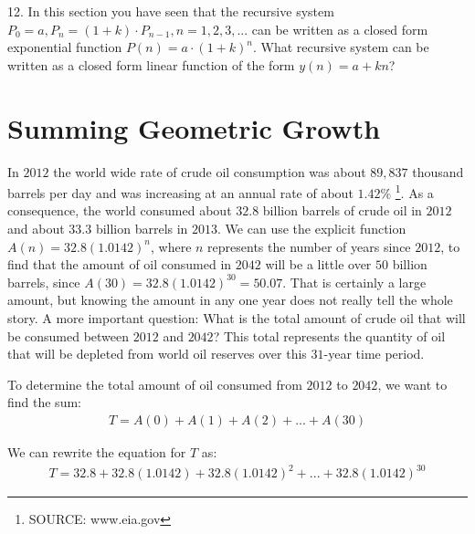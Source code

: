 \documentclass[10pt,]{book}
\theoremstyle{plain}
\theoremstyle{definition}
\theoremstyle{definition}
\theoremstyle{definition}
\numberwithin{equation}{section}
\begin{document}
\begin{exerciselist}
\par\smallskip
\item[12.]\hypertarget{exercise-31}{}\hypertarget{p-136}{}%
In this section you have seen that the recursive system \(P_0=a, P_n=(1+k) \cdot P_{n-1}, n = 1, 2, 3, ...\) can be written as a closed form exponential function \(P(n)=a \cdot (1+k)^n\). What recursive system can be written as a closed form linear function of the form \(y(n)=a+kn\)?%
\par\smallskip
\end{exerciselist}
\typeout{************************************************}
\typeout{************************************************}
\section[{Summing Geometric Growth}]{Summing Geometric Growth}\label{chapter04-section04}
\hypertarget{p-137}{}%
In \(2012\) the world wide rate of crude oil consumption was about \(89,837\) thousand barrels per day and was increasing at an annual rate of about \(1.42\%\) \footnote{SOURCE: www.eia.gov\label{fn-1}}.  As a consequence, the world consumed about \(32.8\) billion barrels of crude oil in \(2012\) and about \(33.3\) billion barrels in \(2013\).  We can use the explicit function \(A(n)=32.8(1.0142)^n\), where \(n\) represents the number of years since \(2012\), to find that the amount of oil consumed in \(2042\) will be a little over \(50\) billion barrels, since \(A(30)=32.8(1.0142)^30 = 50.07\).  That is certainly a large amount, but knowing the amount in any one year does not really tell the whole story.  A more important question:  What is the total amount of crude oil that will be consumed between \(2012\) and \(2042\)?  This total represents the quantity of oil that will be depleted from world oil reserves over this \(31\)-year time period.%
\par
\hypertarget{p-138}{}%
To determine the total amount of oil consumed from \(2012\) to \(2042\), we want to find the sum:%
\begin{gather*}
T=A(0)+A(1)+A(2)+...+A(30)
\end{gather*}
%
\par
\hypertarget{p-139}{}%
We can rewrite the equation for \(T\) as:%
\begin{gather*}
T=32.8+32.8(1.0142)+32.8(1.0142)^2+...+32.8(1.0142)^{30}
\end{gather*}
%
\par
\hypertarget{p-140}{}%
\end{document}
